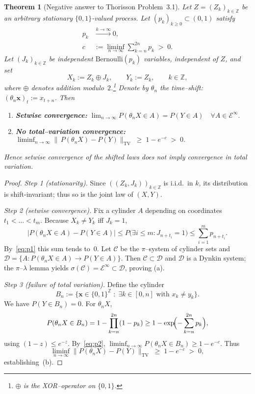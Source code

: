 \documentclass[11pt]{article}
\newtheorem{theorem}{Theorem}
\begin{document}
\begin{theorem}[Negative answer to Thorisson Problem~3.1]
Let $Z=(Z_k)_{k\in\mathbb Z}$ be an \emph{arbitrary} stationary $\{0,1\}$-valued process.
Let $(p_k)_{k\ge0}\subset(0,1)$ satisfy
\begin{subequations}\label{eq:pconds}
\begin{align}
p_k &\xrightarrow{k\to\infty} 0, \label{eq:p1}\\
c  &:= \liminf_{n\to\infty}\sum_{k=n}^{2n}p_k \;>\;0. \label{eq:p2}
\end{align}
\end{subequations}
Let $(J_k)_{k\in\mathbb Z}$ be independent $\mathrm{Bernoulli}(p_k)$ variables, independent of $Z$, and set
\[
  X_k := Z_k \oplus J_k,\qquad
  Y_k := Z_k,\qquad k\in\mathbb Z,
\]
where $\oplus$ denotes addition modulo~$2$.\footnote{%
$\oplus$ is the XOR–operator on $\{0,1\}$.}
Denote by $\theta_n$ the time–shift: $(\theta_n\bm x)_t := x_{t+n}$.
Then
\begin{enumerate}[label=\textup{(\alph*)}]
  \item \textbf{Setwise convergence:}
        \(
          \displaystyle
          \lim_{n\to\infty} P(\theta_n X\in A)=P(Y\in A)
          \quad\forall A\in\mathcal E^{\infty}.
        \)
  \item \textbf{No total–variation convergence:}
        \(
          \displaystyle
          \liminf_{n\to\infty}
          \bigl\|\,P(\theta_n X)-P(Y)\bigr\|_{\mathrm{TV}}
          \;\ge\;1-e^{-c}\;>\;0.
        \)
\end{enumerate}
Hence setwise convergence of the shifted laws does not imply convergence in total variation.
\end{theorem}

\begin{proof}
\textit{Step 1 (stationarity).}
Since $((Z_k,J_k))_{k\in\mathbb Z}$ is i.i.d.\ in $k$, its distribution is shift-invariant; thus so is the joint law of $(X,Y)$.

\smallskip
\textit{Step 2 (setwise convergence).}
Fix a cylinder $A$ depending on coordinates $t_1<\dots<t_m$.
Because $X_k\neq Y_k$ iff $J_k=1$,
\[
  \bigl|P(\theta_n X\in A)-P(Y\in A)\bigr|
  \le P\!\bigl(\exists i\le m: J_{n+t_i}=1\bigr)
  \le \sum_{i=1}^{m} p_{n+t_i}.
\]
By~\eqref{eq:p1} this sum tends to~$0$.
Let $\mathcal C$ be the $\pi$–system of cylinder sets and
$\mathcal D=\{A: P(\theta_n X\in A)\to P(Y\in A)\}$.
Then $\mathcal C\subset\mathcal D$ and $\mathcal D$ is a Dynkin system;
the $\pi$–$\lambda$ lemma yields $\sigma(\mathcal C)=\mathcal E^\infty\subset\mathcal D$,
proving (a).

\smallskip
\textit{Step 3 (failure of total variation).}
Define the cylinder
\[
  B_n := \bigl\{\bm x\in\{0,1\}^{\mathbb Z}\;:\;
           \exists k\in[0,n]\text{ with }x_k\neq y_k \bigr\}.
\]
We have $P(Y\in B_n)=0$.  For $\theta_n X$,
\[
  P(\theta_n X\in B_n)
     = 1-\prod_{k=n}^{2n}(1-p_k)
     \ge 1-\exp\!\Bigl(-\sum_{k=n}^{2n} p_k\Bigr),
\]
using $(1-z)\le e^{-z}$.
By~\eqref{eq:p2}, $\liminf_{n\to\infty}P(\theta_n X\in B_n)\ge 1-e^{-c}$.
Thus
\[
  \liminf_{n\to\infty}\bigl\|P(\theta_n X)-P(Y)\bigr\|_{\mathrm{TV}}
  \;\ge\;1-e^{-c}\;>\;0,
\]
establishing~(b).
\end{proof}
\end{document}
